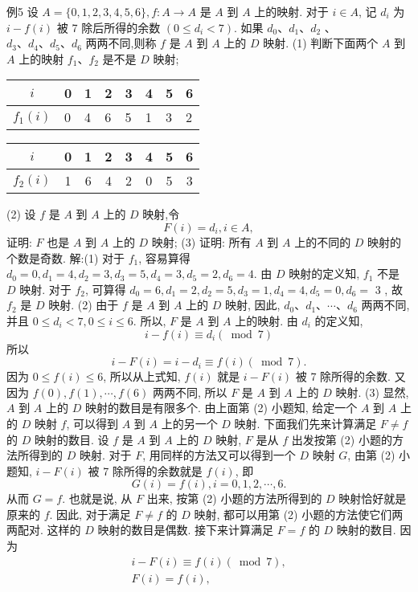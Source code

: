 例5 设 $A=\{0,1,2,3,4,5,6\}, f: A \rightarrow A$ 是 $A$ 到 $A$ 上的映射.
对于 $i \in A$, 记 $d_i$ 为 $i-f(i)$ 被 7 除后所得的余数 $\left(0 \leqslant d_i<7\right)$. 如果 $d_0 、 d_1 、 d_2$ 、 $d_3 、 d_4 、 d_5 、 d_6$ 两两不同,则称 $f$ 是 $A$ 到 $A$ 上的 $D$ 映射.
(1) 判断下面两个 $A$ 到 $A$ 上的映射 $f_1 、 f_2$ 是不是 $D$ 映射;
\begin{tabular}{|c|l|l|l|l|l|l|l|}
\hline $i$ & 0 & 1 & 2 & 3 & 4 & 5 & 6 \\
\hline $f_1(i)$ & 0 & 4 & 6 & 5 & 1 & 3 & 2 \\
\hline
\end{tabular}
\begin{tabular}{|c|c|c|c|c|c|c|c|}
\hline $i$ & 0 & 1 & 2 & 3 & 4 & 5 & 6 \\
\hline $f_2(i)$ & 1 & 6 & 4 & 2 & 0 & 5 & 3 \\
\hline
\end{tabular}
(2) 设 $f$ 是 $A$ 到 $A$ 上的 $D$ 映射,令
$$
F(i)=d_i, i \in A,
$$
证明: $F$ 也是 $A$ 到 $A$ 上的 $D$ 映射;
(3) 证明: 所有 $A$ 到 $A$ 上的不同的 $D$ 映射的个数是奇数.
解:(1) 对于 $f_1$, 容易算得 $d_0=0, d_1=4, d_2=3, d_3=5, d_4=3 ,d_5=2, d_6=4$. 由 $D$ 映射的定义知, $f_1$ 不是 $D$ 映射.
对于 $f_2$, 可算得 $d_0=6, d_1=2, d_2=5, d_3=1, d_4=4, d_5=0, d_6=$ 3 , 故 $f_2$ 是 $D$ 映射.
(2) 由于 $f$ 是 $A$ 到 $A$ 上的 $D$ 映射, 因此, $d_0 、 d_1 、 \cdots 、 d_6$ 两两不同, 并且 $0 \leqslant d_i<7,0 \leqslant i \leqslant 6$. 所以, $F$ 是 $A$ 到 $A$ 上的映射.
由 $d_i$ 的定义知,
$$
i-f(i) \equiv d_i(\bmod 7)
$$
所以
$$
i-F(i)=i-d_i \equiv f(i)(\bmod 7) .
$$
因为 $0 \leqslant f(i) \leqslant 6$, 所以从上式知, $f(i)$ 就是 $i-F(i)$ 被 7 除所得的余数.
又因为 $f(0), f(1), \cdots, f(6)$ 两两不同, 所以 $F$ 是 $A$ 到 $A$ 上的 $D$ 映射.
(3) 显然, $A$ 到 $A$ 上的 $D$ 映射的数目是有限多个.
由上面第 (2) 小题知, 给定一个 $A$ 到 $A$ 上的 $D$ 映射 $f$, 可以得到 $A$ 到 $A$ 上的另一个 $D$ 映射.
下面我们先来计算满足 $F \neq f$ 的 $D$ 映射的数目.
设 $f$ 是 $A$ 到 $A$ 上的 $D$ 映射, $F$ 是从 $f$ 出发按第 (2) 小题的方法所得到的 $D$ 映射.
对于 $F$, 用同样的方法又可以得到一个 $D$ 映射 $G$, 由第 (2) 小题知, $i- F(i)$ 被 7 除所得的余数就是 $f(i)$, 即
$$
G(i)=f(i), i=0,1,2, \cdots, 6 .
$$
从而 $G=f$. 也就是说, 从 $F$ 出来, 按第 (2) 小题的方法所得到的 $D$ 映射恰好就是原来的 $f$. 因此, 对于满足 $F \neq f$ 的 $D$ 映射, 都可以用第 (2) 小题的方法使它们两两配对.
这样的 $D$ 映射的数目是偶数.
接下来计算满足 $F=f$ 的 $D$ 映射的数目.
因为
$$
\begin{gathered}
i-F(i) \equiv f(i)(\bmod 7), \\
F(i)=f(i),
\end{gathered}
$$
